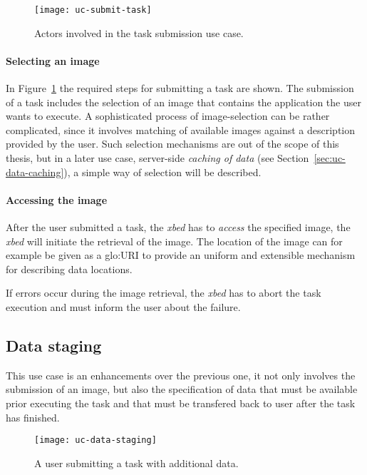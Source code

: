 \begin{figure}[htbp]
  \centering
  \texttt{[image: uc-submit-task]}
  \caption[UC Task submission]{Actors involved  in the task submission use
    case.}
  \label{fig:uc-submit-task}
\end{figure}

\paragraph{Selecting an image}
In  Figure~\ref{fig:uc-submit-task} the  required steps  for  submitting a
task are  shown. The  submission of  a task includes  the selection  of an
image  that  contains  the  application  the user  wants  to  execute.   A
sophisticated process of image-selection  can be rather complicated, since
it involves matching of available images against a description provided by
the user. Such  selection mechanisms are out of the  scope of this thesis,
but  in  a  later  use  case,  server-side  \emph{caching  of  data}  (see
Section~\ref{sec:uc-data-caching}),  a  simple way  of  selection will  be
described.

\paragraph{Accessing the image}
After the user submitted a  task, the \emph{xbed} has to \emph{access} the
specified image,  \ie the \emph{xbed} will initiate the  retrieval of the
image.   The  location  of  the  image  can for  example  be  given  as  a
\gls{glo:URI}  to   provide  an  uniform  and   extensible  mechanism  for
describing data locations.

If errors occur  during the image retrieval, the  \emph{xbed} has to abort
the task execution and must inform the user about the failure.

\subsection{Data staging}
\label{sec:uc-data-staging}

This  use case  is an  enhancements  over the  previous one,  it not  only
involves the  submission of an image,  but also the  specification of data
that  must  be  available  prior  executing  the task  and  that  must  be
transfered back to user after the task has finished.

\begin{figure}[htbp]
  \centering
  \texttt{[image: uc-data-staging]}
  \caption[UC  Data  Staging]{A user  submitting  a  task with  additional
    data.}
  \label{fig:uc-data-staging}
\end{figure}

